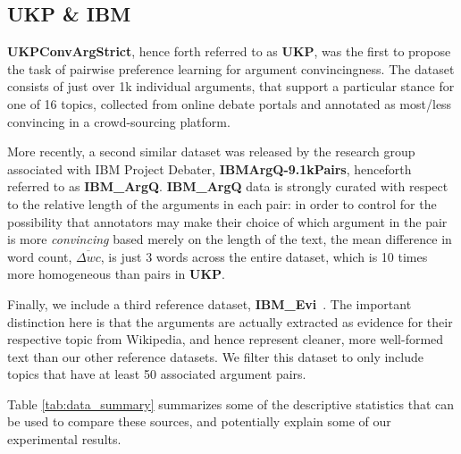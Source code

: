\documentclass[runningheads]{llncs}
\begin{document}
\subsection{UKP \& IBM}
\textbf{UKPConvArgStrict}\cite{habernal_which_2016}, hence forth referred to as 
\textbf{UKP}, was the first to propose the task of pairwise preference learning 
for argument convincingness. 
The dataset consists of just over 1k individual arguments, that support a 
particular stance for one of 16 topics, collected from online debate portals 
and annotated as most/less convincing in a crowd-sourcing platform.  

More recently, a second similar dataset was released by the research group 
associated with IBM Project Debater, 
\textbf{IBMArgQ-9.1kPairs}\cite{toledo_automatic_2019}, henceforth 
referred to as \textbf{IBM\_ArgQ}.
\textbf{IBM\_ArgQ} data is strongly curated with respect to the relative length 
of the arguments in each pair: in order to control for the possibility that 
annotators may make their choice of which argument in the pair is more 
\textit{convincing} based merely on the length of the text, the mean difference 
in word count, $\overline{\Delta wc}$, is just 3 words across the entire 
dataset, which is 10 times more homogeneous than pairs in \textbf{UKP}.

Finally, we include a third reference dataset, 
\textbf{IBM\_Evi}~\cite{gleize_are_2019}. 
The important distinction here is that the arguments are actually extracted as 
evidence for their respective topic from Wikipedia, and hence represent 
cleaner, more well-formed text than our other reference datasets. 
We filter this dataset to only include topics that have at least 50 associated 
argument pairs.

Table \ref{tab:data_summary} summarizes some of the descriptive statistics that 
can be used to compare these sources, and potentially explain some of our 
experimental results. 

\begin{table}
	\caption{Descriptive statistics for each dataset of argument pairs, with 
		last rows showing \textbf{xxxxxxxx} data split by discipline. 
		$N_{\mathrm{args}}$ 
		is the number of individual arguments, distributed across $N_{\mathrm{pairs}}$ 
		revolving around $N_{\mathrm{topics}}$. $N_{\mathrm{vocab}}$ is the number of unique 
		tokens in all the arguments. $\overline{wc}$ is the average number of 
		words per argument, shown with the standard deviation $(SD)$. 
		$\overline{\Delta wc}$ is the average relative difference in number of 
		words for each argument in each pair.%
		}
	\centerline{}
	\label{tab:data_summary}
\end{table}
\end{document}
